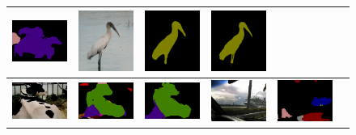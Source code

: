 \begin{figure}[!htbp]
{\begin{tabular}{c c c | c c c}
    \includegraphics[height=0.12\linewidth]{fig/res_crf/2007_002852.png} &
    \includegraphics[height=0.12\linewidth]{fig/img/2010_001069.jpg} &
    \includegraphics[height=0.12\linewidth]{fig/res_none/2010_001069.png} &
    \includegraphics[height=0.12\linewidth]{fig/res_crf/2010_001069.png} \\
    \hline
    \hline
    \includegraphics[height=0.12\linewidth]{fig/img/2007_000491.jpg} &
    \includegraphics[height=0.12\linewidth]{fig/res_none/2007_000491.png} &
    \includegraphics[height=0.12\linewidth]{fig/res_crf/2007_000491.png} &
    \includegraphics[height=0.12\linewidth]{fig/img/2007_000529.jpg} &
    \includegraphics[height=0.12\linewidth]{fig/res_none/2007_000529.png} &

\end{tabular}}
\end{figure}
